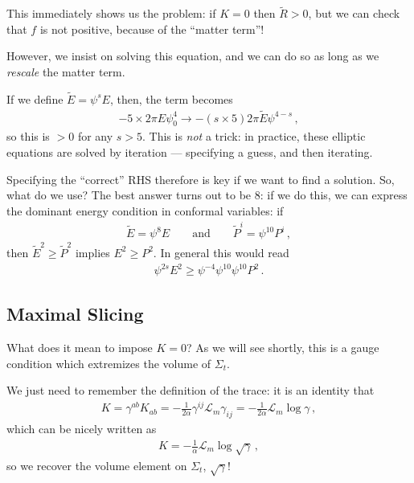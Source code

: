 \documentclass[main.tex]{subfiles}
\begin{document}
This immediately shows us the problem: if \(K =0 \) then \(\widetilde{R} > 0\), but we can check that \(f\) is not positive, because of the ``matter term''! 

However, we insist on solving this equation, and we can do so as long as we \emph{rescale} the matter term. 

If we define \(\widetilde{E} = \psi^{s} E\), then, the term becomes 
%
\begin{align}
- 5 \times 2 \pi E \psi_0^{4} \to - (s \times 5) 2 \pi \widetilde{E} \psi^{4-s}
\,,
\end{align}
%
so this is \(> 0\) for any \(s > 5\). 
This is \emph{not} a trick: in practice, these elliptic equations are solved by iteration --- specifying a guess, and then iterating. 

Specifying the ``correct'' RHS therefore is key if we want to find a solution. 
So, what do we use? 
The best answer turns out to be 8: if we do this, we can express the dominant energy condition in conformal variables: if
%
\begin{align}
\widetilde{E} = \psi^{8} E
\qquad \text{and} \qquad
\widetilde{P}^{i} = \psi^{10} P^{i}
\,,
\end{align}
%
then \(\widetilde{E}^2 \geq \widetilde{P}^2\) implies \(E^2 \geq P^2\). In general this would read 
%
\begin{align}
\psi^{2s} E^2 \geq \psi^{-4} \psi^{10} \psi^{10} P^2
\,.
\end{align}

\subsection{Maximal Slicing}

What does it mean to impose \(K = 0\)? 
As we will see shortly, this is a gauge condition which extremizes the volume of \(\Sigma _t\). 

We just need to remember the definition of the trace: it is an identity that
%
\begin{align}
K = \gamma^{ab} K_{ab} = - \frac{1}{2 \alpha } \gamma^{ij} \mathscr{L}_m \gamma_{ij} = - \frac{1}{2 \alpha } \mathscr{L}_m \log \gamma 
\,,
\end{align}
%
which can be nicely written as 
%
\begin{align}
K = - \frac{1}{\alpha } \mathscr{L}_m \log \sqrt{\gamma } 
\,,
\end{align}
%
so we recover the volume element on \(\Sigma _t\), \(\sqrt{\gamma }\)! 
\end{document}
